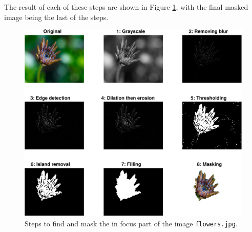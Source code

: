 \documentclass[a4paper]{article}
\begin{document}
The result of each of these steps are shown in Figure \ref{fig:q6}, with the final masked image being the last of the steps.
\begin{figure}[H]
  \centering
  \includegraphics[width=\textwidth]{q6-crop.pdf}
  \caption{Steps to find and mask the in focus part of the image \texttt{flowers.jpg}.}
  \label{fig:q6}
\end{figure}
\end{document}

